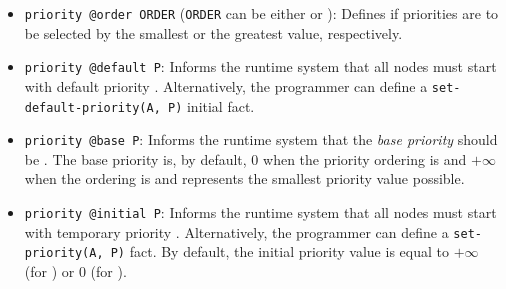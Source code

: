 
\begin{itemize}

   \item \texttt{priority @order ORDER} (\texttt{ORDER} can be either 
      or ): Defines if priorities are to be selected by the smallest
      or the greatest value, respectively.

   \item \texttt{priority @default P}: Informs the runtime system that all nodes
      must start with default priority . Alternatively, the programmer can define a
      \texttt{set-default-priority(A, P)} initial fact.

   \item \texttt{priority @base P}: Informs the runtime system that the
      \emph{base priority} should be . The base priority is, by default,
      0 when the priority ordering is  and $+\infty$ when the ordering
      is  and represents the smallest priority value possible.

   \item \texttt{priority @initial P}: Informs the runtime system that all nodes
   must start with temporary priority . Alternatively, the programmer can define a
      \texttt{set-priority(A, P)} fact. By default, the initial priority value is equal to $+\infty$ (for ) or $0$ (for ).
      
\end{itemize}

